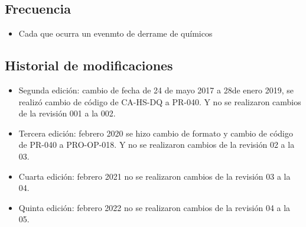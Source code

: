 \subsection{Frecuencia}

\begin{itemize}
	\item Cada que ocurra un evenmto de derrame de químicos
\end{itemize}

\subsection{Historial de modificaciones}

\begin{itemize}
	\item Segunda edición: cambio de fecha de 24 de mayo 2017 a 28de enero 2019, se realizó cambio de código de CA-HS-DQ a PR-040. Y no se realizaron cambios de la revisión 001 a la 002.
	\item Tercera edición: febrero 2020 se hizo cambio de formato y cambio de código de PR-040 a PRO-OP-018. Y no se realizaron cambios de la revisión 02 a la 03.
	\item Cuarta edición: febrero 2021 no se realizaron cambios de la revisión 03 a la 04.
	\item Quinta edición: febrero 2022 no se realizaron cambios de la revisión 04 a la 05.
\end{itemize}
